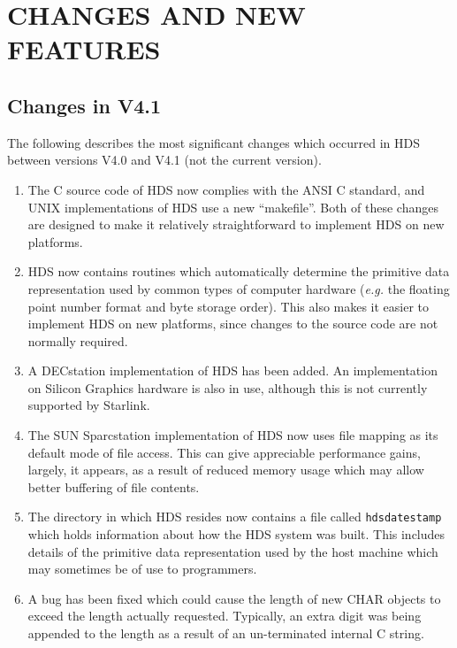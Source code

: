 \documentclass[twoside,11pt]{article}
\newcommand{\xlabel}[1]{}
\renewcommand{\_}{\texttt{\symbol{95}}}
\newcommand{\hi}[1]{{\tt{#1}}}
\newcommand{\qt}[1]{``#1''}
\newcommand{\st}[1]{{\em{#1}}}
\newcommand{\qt}[1]{{\tt{"}}#1{\tt{"}}}
\begin{document}
\newpage
\section{\xlabel{changes_and_new_features}CHANGES AND NEW FEATURES}

\subsection{Changes in V4.1}

The following describes the most significant changes which occurred in HDS
between versions V4.0 and V4.1 (not the current version).

\begin{enumerate}

\item
The C source code of HDS now complies with the ANSI C standard, and
UNIX implementations of HDS use a new \qt{makefile}. Both of these
changes are designed to make it relatively straightforward to
implement HDS on new platforms.

\item
HDS now contains routines which automatically determine the primitive
data representation used by common types of computer hardware
(\st{e.g.} the floating point number format and byte storage
order). This also makes it easier to implement HDS on new platforms,
since changes to the source code are not normally required.

\item
A DECstation implementation of HDS has been added. An implementation
on Silicon Graphics hardware is also in use, although this is not
currently supported by Starlink.

\item
The SUN Sparcstation implementation of HDS now uses file mapping as
its default mode of file access. This can give appreciable performance
gains, largely, it appears, as a result of reduced memory usage which
may allow better buffering of file contents.

\item
The directory in which HDS resides now contains a file called
\hi{hds\_datestamp} which holds information about how the HDS system
was built. This includes details of the primitive data representation
used by the host machine which may sometimes be of use to programmers.

\item
A bug has been fixed which could cause the length of new \_CHAR
objects to exceed the length actually requested. Typically, an extra
digit was being appended to the length as a result of an un-terminated
internal C string.


\end{enumerate}
\end{document}
